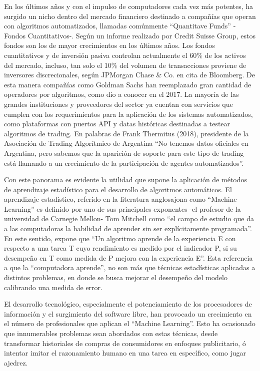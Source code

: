 \documentclass[a4paper,12pt]{Latex/Classes/PhDthesisPSnPDF}
\begin{document}
En los últimos años y con el impulso de computadores cada vez más potentes, ha surgido un nicho dentro del mercado financiero destinado a compañías que operan con algoritmos automatizados, llamadas comúnmente “Quantitave Funds” -Fondos Cuantitativos-. Según un informe realizado por Credit Suisse Group, estos fondos son los de mayor crecimientos en los últimos años. Los fondos cuantitativos y de inversión pasiva controlan actualmente el 60\% de los activos del mercado, incluso, tan solo el 10\% del volumen de transacciones proviene de inversores discrecionales, según JPMorgan Chase \& Co. en cita de Bloomberg. De esta manera compañías como Goldman Sachs han reemplazado gran cantidad de operadores por algoritmos, como dio a conocer en el 2017. La mayoría de las grandes instituciones y proveedores del sector ya cuentan con servicios que cumplen con los requerimientos para la aplicación de los sistemas automatizados, como plataformas con puertos API y datas históricas destinadas a testear algoritmos de trading. En palabras de Frank Thermitus (2018), presidente de la Asociación de Trading Algorítmico de Argentina “No tenemos datos oficiales en Argentina, pero sabemos que la aparición de soporte para este tipo de trading está llamando a un crecimiento de la participación de agentes automatizados”.

Con este panorama es evidente la utilidad que supone la aplicación de métodos de aprendizaje estadístico para el desarrollo de algoritmos automáticos. El aprendizaje estadístico, referido en la literatura anglosajona como “Machine Learning” es definido por uno de sus principales exponentes -el profesor de la universidad de Carnegie Mellon- Tom Mitchell como “el campo de estudio que da a las computadoras la habilidad de aprender sin ser explícitamente programada”. En este sentido, expone que “Un algoritmo aprende de la experiencia E con respecto a una tarea T cuyo rendimiento es medido por el indicador P, si su desempeño en T como medida de P mejora con la experiencia E”. Esta referencia a que la “computadora aprende”, no son más que técnicas estadísticas aplicadas a distintos problemas, en donde se busca mejorar el desempeño del modelo calibrando una medida de error.

El desarrollo tecnológico, especialmente el potenciamiento de los procesadores de información y el surgimiento del software libre, han provocado un crecimiento en el número de profesionales que aplican el “Machine Learning”. Esto ha ocasionado que innumerables problemas sean abordados con estas técnicas, desde transformar historiales de compras de consumidores en enfoques publicitario, ó intentar imitar el razonamiento humano en una tarea en específico, como jugar ajedrez.
\end{document}
